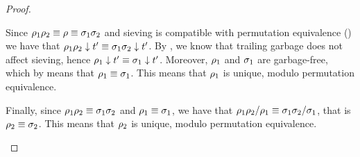 \begin{proof}
\begin{itemize}
  Since $\rho_1\rho_2 \equiv \rho \equiv \sigma_1\sigma_2$
  and sieving is compatible with permutation equivalence ()
  we have that $\rho_1\rho_2 \downarrow t' \equiv \sigma_1\sigma_2 \downarrow t'$.
  By , we know that trailing garbage does not affect sieving,
  hence $\rho_1 \downarrow t' \equiv \sigma_1 \downarrow t'$.
  Moreover, $\rho_1$ and $\sigma_1$ are garbage-free, which
  by  means
  that $\rho_1 \equiv \sigma_1$.
  This means that $\rho_1$ is unique, modulo permutation equivalence.

  Finally, since $\rho_1\rho_2 \equiv \sigma_1\sigma_2$ and $\rho_1 \equiv \sigma_1$,
  we have that $\rho_1\rho_2/\rho_1 \equiv \sigma_1\sigma_2/\sigma_1$,
  that is $\rho_2 \equiv \sigma_2$.
  This means that $\rho_2$ is unique, modulo permutation equivalence.
\end{itemize}
\end{proof}
